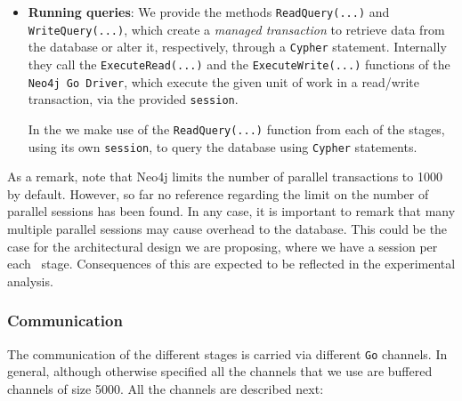 \begin{itemize}
    \item \textbf{Running queries}: We provide the methods  \texttt{ReadQuery(...)} and \texttt{WriteQuery(...)}, which create a \textit{managed transaction} to retrieve data from the database or alter it, respectively, through a \texttt{Cypher} statement. 
    Internally they call the \texttt{ExecuteRead(...)} and the \texttt{ExecuteWrite(...)} functions of the \texttt{Neo4j Go Driver}, which execute the given unit of work in a read/write transaction, via the provided \texttt{session}.

    In the \DPATM we make use of the \texttt{ReadQuery(...)} function from each of the \filter stages, using its own \texttt{session}, to query the database using \texttt{Cypher} statements.
\end{itemize}

As a remark, note that Neo4j limits the number of parallel transactions to 1000 by default. However, so far no reference regarding the limit on the number of parallel sessions has been found. In any case, it is important to remark that many multiple parallel sessions may cause overhead to the database. This could be the case for the architectural design we are proposing, where we have a session per each \filter\ stage. Consequences of this are expected to be reflected in the experimental analysis.

\subsubsection*{Communication}

The communication of the different stages is carried via different \texttt{Go} channels. In general, although otherwise specified all the channels that we use are buffered channels of size 5000. All the channels are described next:

